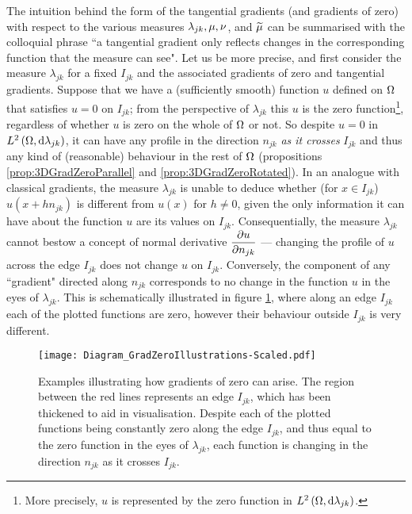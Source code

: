 The intuition behind the form of the tangential gradients (and gradients of zero) with respect to the various measures $\lambda_{jk}, \mu, \nu$, and $\widetilde{\mu}$ can be summarised with the colloquial phrase ``a tangential gradient only reflects changes in the corresponding function that the measure can see".
Let us be more precise, and first consider the measure $\lambda_{jk}$ for a fixed $I_{jk}$ and the associated gradients of zero and tangential gradients.
Suppose that we have a (sufficiently smooth) function $u$ defined on $\Omega$ that satisfies $u=0$ on $I_{jk}$; from the perspective of $\lambda_{jk}$ this $u$ is the zero function\footnote{More precisely, $u$ is represented by the zero function in $L^{2}\left( \Omega,\mathrm{d} \lambda_{jk} \right)$.}, regardless of whether $u$ is zero on the whole of $\Omega$ or not.
So despite $u=0$ in $L^{2}\left( \Omega,\mathrm{d} \lambda_{jk} \right)$, it can have any profile in the direction $n_{jk}$ \emph{as it crosses} $I_{jk}$ and thus any kind of (reasonable) behaviour in the rest of $\Omega$ (propositions \ref{prop:3DGradZeroParallel} and \ref{prop:3DGradZeroRotated}).
In an analogue with classical gradients, the measure $\lambda_{jk}$ is unable to deduce whether (for $x\in I_{jk}$) $u(x+hn_{jk})$ is different from $u(x)$ for $h\neq0$, given the only information it can have about the function $u$ are its values on $I_{jk}$.
Consequentially, the measure $\lambda_{jk}$ cannot bestow a concept of normal derivative $\dfrac{\partial u}{\partial n_{jk}}$ --- changing the profile of $u$ across the edge $I_{jk}$ does not change $u$ on $I_{jk}$.
Conversely, the component of any ``gradient" directed along $n_{jk}$ corresponds to no change in the function $u$ in the eyes of $\lambda_{jk}$.
This is schematically illustrated in figure \ref{fig:Diagram_GradZeroIllustrations}, where along an edge $I_{jk}$ each of the plotted functions are zero, however their behaviour outside $I_{jk}$ is very different.
\begin{figure}[b!]
	\centering
	\texttt{[image: Diagram\_GradZeroIllustrations-Scaled.pdf]}
	\caption[Illustration of how gradients of zero can arise from functions that are not almost-everywhere zero.]{\label{fig:Diagram_GradZeroIllustrations} Examples illustrating how gradients of zero can arise. The region between the red lines represents an edge $I_{jk}$, which has been thickened to aid in visualisation. Despite each of the plotted functions being constantly zero along the edge $I_{jk}$, and thus equal to the zero function in the eyes of $\lambda_{jk}$, each function is changing in the direction $n_{jk}$ as it crosses $I_{jk}$.}
\end{figure}
